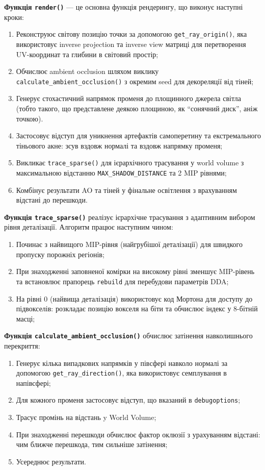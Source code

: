 \textbf{Функція \texttt{render()}} --- це основна функція рендерингу, що виконує наступні кроки:

\begin{enumerate}[itemsep=0pt, topsep=0pt]
    \item Реконструює світову позицію точки за допомогою \texttt{get\_ray\_origin()}, яка використовує inverse projection та inverse view матриці для перетворення UV-координат та глибини в світовий простір;
    \item Обчислює ambient occlusion шляхом виклику \texttt{calculate\_ambient\_occ\-lusion()} з окремим seed для декореляції від тіней;
    \item Генерує стохастичний напрямок променя до площинного джерела світла (тобто такого, що представлене деякою площиною, як ``сонячний диск'', аніж точкою).
    \item Застосовує відступ для уникнення артефактів самоперетину та екстремального тіньового акне: зсув вздовж нормалі та вздовж напрямку променя;
    \item Викликає \texttt{trace\_sparse()} для ієрархічного трасування у world volume з максимальною відстанню \texttt{MAX\_SHADOW\_DISTANCE} та 2 MIP рівнями;
    \item Комбінує результати AO та тіней у фінальне освітлення з врахуванням відстані до перешкоди.
\end{enumerate}

\textbf{Функція \texttt{trace\_sparse()}} реалізує ієрархічне трасування з адаптивним вибором рівня деталізації. Алгоритм працює наступним чином:

\begin{enumerate}[itemsep=0pt, topsep=0pt]
    \item Починає з найвищого MIP-рівня (найгрубішої деталізації) для швидкого пропуску порожніх регіонів;
    \item При знаходженні заповненої комірки на високому рівні зменшує MIP-рівень та встановлює прапорець \texttt{rebuild} для перебудови параметрів DDA;
    \item На рівні 0 (найвища деталізація) використовує код Мортона для доступу до підвокселів: розкладає позицію вокселя на біти та обчислює індекс у 8-бітній масці;
\end{enumerate}

\textbf{Функція \texttt{calculate\_ambient\_occlusion()}} обчислює затінення навколиш\-нього перекриття:

\begin{enumerate}[itemsep=0pt, topsep=0pt]
    \item Генерує кілька випадкових напрямків у півсфері навколо нормалі за допомогою \texttt{get\_ray\_direction()}, яка використовує семплування в напівсфері;
    \item Для кожного променя застосовує відступ, що вказаний в \texttt{debug\-options};
    \item Трасує промінь на відстань y World Volume;
    \item При знаходженні перешкоди обчислює фактор оклюзії з урахуванням відстані: чим ближче перешкода, тим сильніше затінення;
    \item Усереднює результати.
\end{enumerate}
